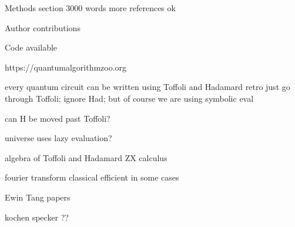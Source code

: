 \documentclass{article}
\begin{document}
\begin{refsection}
Methods section
  3000 words
  more references ok
  
Author contributions

Code available  

https://quantumalgorithmzoo.org

every quantum circuit can be written using Toffoli and Hadamard
retro just go through Toffoli; ignore Had; but of course we are using symbolic eval

can H be moved past Toffoli?

universe uses lazy evaluation?

algebra of Toffoli and Hadamard
ZX calculus

fourier transform classical efficient in some cases

Ewin Tang papers

kochen specker ??


\printbibliography[heading=subbibliography]
\end{refsection}

\end{document}
